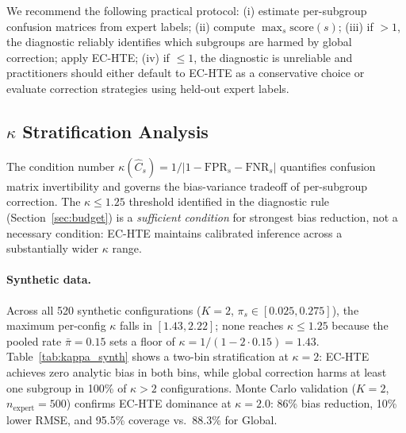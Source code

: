 We recommend the following practical protocol: (i) estimate per-subgroup confusion matrices from expert labels; (ii) compute $\max_s \mathrm{score}(s)$; (iii) if $> 1$, the diagnostic reliably identifies which subgroups are harmed by global correction; apply EC-HTE; (iv) if $\leq 1$, the diagnostic is unreliable and practitioners should either default to EC-HTE as a conservative choice or evaluate correction strategies using held-out expert labels.

\subsection{$\kappa$ Stratification Analysis}
\label{app:kappa_analysis}

The condition number $\kappa(\hat{C}_s) = 1/|1 - \mathrm{FPR}_s - \mathrm{FNR}_s|$ quantifies confusion matrix invertibility and governs the bias-variance tradeoff of per-subgroup correction.
The $\kappa \leq 1.25$ threshold identified in the diagnostic rule (Section~\ref{sec:budget}) is a \emph{sufficient condition} for strongest bias reduction, not a necessary condition: EC-HTE maintains calibrated inference across a substantially wider $\kappa$ range.

\paragraph{Synthetic data.}
Across all 520 synthetic configurations ($K{=}2$, $\pi_s \in [0.025, 0.275]$), the maximum per-config $\kappa$ falls in $[1.43, 2.22]$; none reaches $\kappa \leq 1.25$ because the pooled rate $\bar{\pi}{=}0.15$ sets a floor of $\kappa{=}1/(1{-}2 \cdot 0.15){=}1.43$.
Table~\ref{tab:kappa_synth} shows a two-bin stratification at $\kappa{=}2$: EC-HTE achieves zero analytic bias in both bins, while global correction harms at least one subgroup in 100\% of $\kappa > 2$ configurations.
Monte Carlo validation ($K{=}2$, $n_{\text{expert}}{=}500$) confirms EC-HTE dominance at $\kappa{=}2.0$: 86\% bias reduction, 10\% lower RMSE, and 95.5\% coverage vs.\ 88.3\% for Global.

\begin{table}[h]
\centering
\caption{Synthetic $\kappa$ stratification ($K{=}2$, 520 configs). ``Debiasing hurts'' = global correction increases $|\text{bias}|$ for $\geq$1 subgroup.}
\label{tab:kappa_synth}
\small
{}
\end{table}

